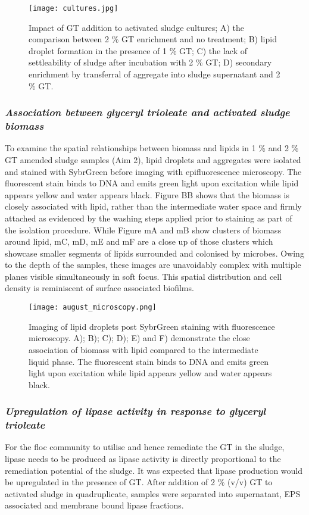 \documentclass[twoside]{article}
\begin{document}
\begin{figure}
\texttt{[image: cultures.jpg]}
\caption{Impact of GT addition to activated sludge cultures; A) the comparison between 2 \% GT enrichment and no treatment; B) lipid droplet formation in the presence of 1 \% GT; C) the lack of settleability of sludge after incubation with 2 \% GT; D) secondary enrichment by transferral of aggregate into sludge supernatant and 2 \% GT.}
\end{figure}
\FloatBarrier

\subsubsection{\emph{Association between glyceryl trioleate and activated sludge biomass}}
To examine the spatial relationships between biomass and lipids in 1 \% and 2 \% GT amended sludge samples (Aim 2), lipid droplets and aggregates were isolated and stained with SybrGreen before imaging with epifluorescence microscopy. The fluorescent stain binds to DNA and emits green light upon excitation while lipid appears yellow and water appears black. Figure BB shows that the biomass is closely associated with lipid, rather than the intermediate water space and firmly attached as evidenced by the washing steps applied prior to staining as part of the isolation procedure. While Figure mA and mB show clusters of biomass around lipid, mC, mD, mE and mF are a close up of those clusters which showcase smaller segments of lipids surrounded and colonised by microbes. Owing to the depth of the samples, these images are unavoidably complex with multiple planes visible simultaneously in soft focus. This spatial distribution and cell density is reminiscent of surface associated biofilms.
\begin{figure}
\texttt{[image: august\_microscopy.png]}
\caption{Imaging of lipid droplets post SybrGreen staining with fluorescence microscopy. A); B); C); D); E) and F) demonstrate the close association of biomass with lipid compared to the intermediate liquid phase.
The fluorescent stain binds to DNA and emits green light upon excitation while lipid appears yellow and water appears black.}
\end{figure}

\FloatBarrier
\subsubsection{\emph{Upregulation of lipase activity in response to glyceryl trioleate}}
For the floc community to utilise and hence remediate the GT in the sludge, lipase needs to be produced as lipase activity is directly proportional to the remediation potential of the sludge. It was expected that lipase production would be upregulated in the presence of GT.
After addition of 2 \% (v/v) GT to activated sludge in quadruplicate, samples were separated into supernatant, EPS associated and membrane bound lipase fractions. \\
\end{document}
